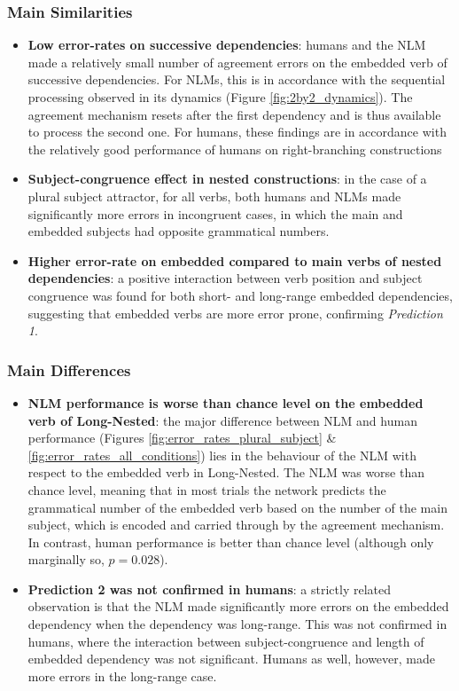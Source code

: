 \subsubsection{Main Similarities}
\begin{itemize}
    \item \textbf{Low error-rates on successive dependencies}: humans and the NLM made a relatively small number of agreement errors on the embedded verb of successive dependencies. For NLMs, this is in accordance with the sequential processing observed in its dynamics (Figure \ref{fig:2by2_dynamics}). The agreement mechanism resets after the first dependency and is thus available to process the second one. For humans, these findings are in accordance with the relatively good performance of humans on right-branching constructions \citep{blaubergs1974short, miller1964free}
    \item \textbf{Subject-congruence effect in nested constructions}: in the case of a plural subject attractor, for all verbs, both humans and NLMs made significantly more errors in incongruent cases, in which the main and embedded subjects had opposite grammatical numbers.
    \item \textbf{Higher error-rate on embedded compared to main verbs of nested dependencies}: a positive interaction between verb position and subject congruence was found for both short- and long-range embedded dependencies, suggesting that embedded verbs are more error prone, confirming \textit{Prediction 1}.

    
\end{itemize}

\subsubsection{Main Differences}
    \begin{itemize}
        \item \textbf{NLM performance is worse than chance level on the embedded verb of Long-Nested}: the major difference between NLM and human performance (Figures \ref{fig:error_rates_plural_subject} \& \ref{fig:error_rates_all_conditions}) lies in the behaviour of the NLM with respect to the embedded verb in Long-Nested. The NLM was worse than chance level, meaning that in most trials the network predicts the grammatical number of the embedded verb based on the number of the main subject, which is encoded and carried through by the agreement mechanism. In contrast, human performance is better than chance level (although only marginally so, $p = 0.028$).
        \item \textbf{Prediction 2 was not confirmed in humans}: a strictly related observation is that the NLM made significantly more errors on the embedded dependency when the dependency was long-range. This was not confirmed in humans, where the interaction between subject-congruence and length of embedded dependency was not significant. Humans as well, however, made more errors in the long-range case.
    \end{itemize}
    


